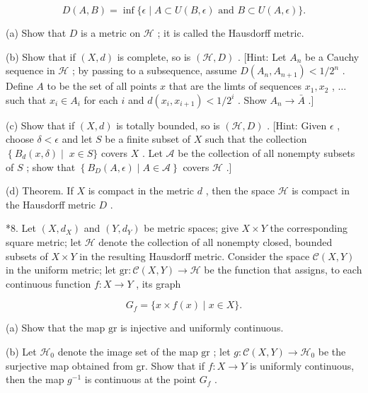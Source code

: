 \documentclass[10pt]{article}
\begin{document}
\[
D\left( {A,B}\right)  = \inf \{ \epsilon  \mid  A \subset  U\left( {B,\epsilon }\right) \text{ and }B \subset  U\left( {A,\epsilon }\right) \} .
\]

(a) Show that \(D\) is a metric on \(\mathcal{H}\) ; it is called the Hausdorff metric.

(b) Show that if \(\left( {X,d}\right)\) is complete, so is \(\left( {\mathcal{H},D}\right)\) . [Hint: Let \({A}_{n}\) be a Cauchy sequence in \(\mathcal{H}\) ; by passing to a subsequence, assume \(D\left( {{A}_{n},{A}_{n + 1}}\right)  < 1/{2}^{n}\) . Define \(A\) to be the set of all points \(x\) that are the limts of sequences \({x}_{1},{x}_{2}\) , \(\ldots\) such that \({x}_{i} \in  {A}_{i}\) for each \(i\) and \(d\left( {{x}_{i},{x}_{i + 1}}\right)  < 1/{2}^{i}\) . Show \({A}_{n} \rightarrow  \bar{A}\) .]

(c) Show that if \(\left( {X,d}\right)\) is totally bounded, so is \(\left( {\mathcal{H},D}\right)\) . [Hint: Given \(\epsilon\) , choose \(\delta  < \epsilon\) and let \(S\) be a finite subset of \(X\) such that the collection \(\left\{  {{B}_{d}\left( {x,\delta }\right) }\right.  \mid \; x \in  S\}\) covers \(X\) . Let \(\mathcal{A}\) be the collection of all nonempty subsets of \(S\) ; show that \(\left\{  {{B}_{D}\left( {A,\epsilon }\right)  \mid  A \in  \mathcal{A}}\right\}\) covers \(\mathcal{H}\) .]

(d) Theorem. If \(X\) is compact in the metric \(d\) , then the space \(\mathcal{H}\) is compact in the Hausdorff metric \(D\) .

*8. Let \(\left( {X,{d}_{X}}\right)\) and \(\left( {Y,{d}_{Y}}\right)\) be metric spaces; give \(X \times  Y\) the corresponding square metric; let \(\mathcal{H}\) denote the collection of all nonempty closed, bounded subsets of \(X \times  Y\) in the resulting Hausdorff metric. Consider the space \(\mathcal{C}\left( {X,Y}\right)\) in the uniform metric; let \(\mathrm{{gr}} : \mathcal{C}\left( {X,Y}\right)  \rightarrow  \mathcal{H}\) be the function that assigns, to each continuous function \(f : X \rightarrow  Y\) , its graph

\[
{G}_{f} = \{ x \times  f\left( x\right)  \mid  x \in  X\} .
\]

(a) Show that the map \(\mathrm{{gr}}\) is injective and uniformly continuous.

(b) Let \({\mathcal{H}}_{0}\) denote the image set of the map \(\mathrm{{gr}}\) ; let \(g : \mathcal{C}\left( {X,Y}\right)  \rightarrow  {\mathcal{H}}_{0}\) be the surjective map obtained from gr. Show that if \(f : X \rightarrow  Y\) is uniformly continuous, then the map \({g}^{-1}\) is continuous at the point \({G}_{f}\) .
\end{document}
